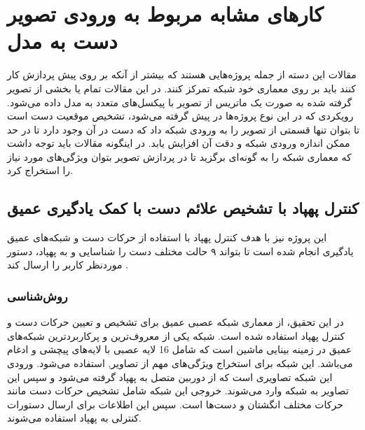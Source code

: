 




\section{کارهای مشابه مربوط به ورودی تصویر دست به مدل}
مقالات این دسته از جمله پروژه‌هایی هستند که بیشتر از آنکه بر روی پیش پردازش کار کنند باید بر روی معماری خود شبکه تمرکز کنند. در این مقالات تمام یا بخشی از تصویر گرفته شده به صورت یک ماتریس از تصویر با پیکسل‌های متعدد به مدل داده می‌شود. رویکردی که در این نوع پروژه‌ها در پیش گرفته می‌شود، تشخیص موقعیت دست است تا بتوان تنها قسمتی از تصویر را به ورودی شبکه داد که دست در آن وجود دارد تا در حد ممکن
 اندازه ورودی شبکه و دقت آن افزایش یابد. در اینگونه مقالات باید توجه داشت که معماری شبکه را به گونه‌ای برگزید تا در پردازش تصویر بتوان ویژگی‌های مورد نیاز را استخراج کرد.


\subsection {کنترل پهپاد با تشخيص علائم دست با کمک یادگیری عمیق}
این پروژه نیز با هدف کنترل پهپاد با استفاده از حرکات دست و شبکه‌های عمیق یادگیری انجام شده است تا بتواند ۹ حالت مختلف دست را شناسایی و به پهپاد، دستور موردنظر کاربر را ارسال کند \cite{hadri2018hand}.

\subsubsection{روش‌شناسی}
در این تحقیق، از معماری شبکه عصبی عمیق  برای تشخیص و تعیین حرکات دست و کنترل پهپاد استفاده شده است. شبکه  یکی از معروف‌ترین و پرکاربردترین شبکه‌های عمیق در زمینه بینایی ماشین است که 
شامل 16 لایه عصبی با لایه‌های پیچشی و ادغام  می‌باشد. این شبکه برای استخراج ویژگی‌های مهم از تصاویر, استفاده می‌شود. ورودی این شبکه تصاویری است که از دوربین متصل به پهپاد گرفته می‌شود و سپس این 
تصاویر به شبکه وارد می‌شوند. خروجی این شبکه شامل تشخیص حرکات دست مانند حرکات مختلف انگشتان و دست‌ها است. سپس این اطلاعات برای ارسال دستورات کنترلی به پهپاد استفاده می‌شوند. 


